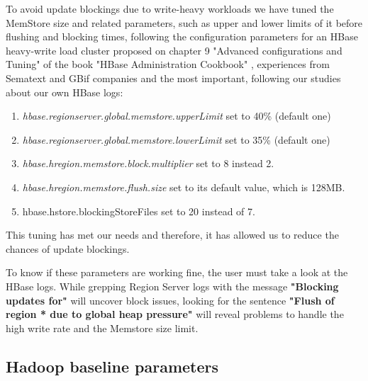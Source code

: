 \begin{enumerate}
To avoid update blockings due to write-heavy workloads we have tuned the MemStore size and related parameters, such as upper and lower limits of it before flushing and blocking times, following the configuration parameters for an HBase heavy-write load cluster proposed on chapter 9 "Advanced configurations and Tuning" of the book "HBase Administration Cookbook" \cite{jiang2012hbase}, experiences from Sematext \cite{MemstoreSematext} and GBif companies \cite{MemstoreGBif} and the most important, following our studies about our own HBase logs:
\bigskip
\begin{enumerate}
\item \textit{hbase.regionserver.global.memstore.upperLimit} set to 40\% (default one)
\item \textit{hbase.regionserver.global.memstore.lowerLimit} set to 35\% (default one)
\item \textit{hbase.hregion.memstore.block.multiplier} set to 8 instead 2.
\item \textit{hbase.hregion.memstore.flush.size} set to its default value, which is 128MB.
\item {hbase.hstore.blockingStoreFiles} set to 20 instead of 7.
\end{enumerate}

This tuning has met our needs and therefore, it has allowed us to reduce the chances of update blockings.
\par
To know if these parameters are working fine, the user must take a look at the HBase logs. While grepping Region Server logs with the message \textbf{"Blocking updates for"} will uncover block issues, looking for the sentence \textbf{"Flush of region * due to global heap pressure"} will reveal problems to handle the high write rate and the Memstore size limit.


\end{enumerate}


\subsection{Hadoop baseline parameters}

